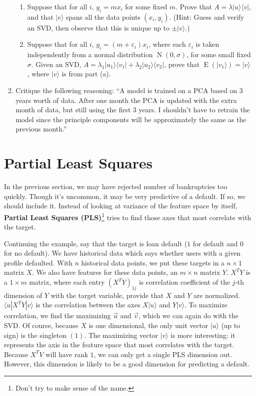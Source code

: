 \documentclass{amsbook}
\begin{document}
\begin{enumerate}
\begin{enumerate}
\item Suppose that for all $i$, $y_i=mx_i$ for some fixed $m$.  Prove that $A=\lambda|u\rangle\langle v|$, and that $|v\rangle$ spans all the data points $(x_i, y_i)$.  (Hint: Guess and verify an SVD, then observe that this is unique up to $\pm |v\rangle$.)
\item Suppose that for all $i$, $y_i=(m+\varepsilon_i)x_i$, where each $\varepsilon_i$ is taken independently from a normal distribution $\operatorname{N}(0, \sigma)$, for some small fixed $\sigma$.  Given an SVD, $A=\lambda_1|u_1\rangle\langle v_1|+\lambda_2|u_2\rangle\langle v_2|$, prove that $\operatorname{E}\left(|v_1\rangle\right)=|v\rangle$, where $|v\rangle$ is from part (a).
\end{enumerate}
\item Critique the following reasoning:  “A model is trained on a PCA based on 3 years worth of data.  After one month the PCA is updated with the extra month of data, but still using the first 3 years.  I shouldn’t have to retrain the model since the principle components will be approximately the same as the previous month.”
\end{enumerate}

\section{Partial Least Squares}

In the previous section, we may have rejected number of bankruptcies too quickly.  Though it's uncommon, it may be very predictive of a default.  If so, we should include it.  Instead of looking at variance of the feature space by itself, {\bf Partial Least Squares (PLS)}\footnote{Don't try to make sense of the name.} tries to find those axes that most correlate with the target.

Continuing the example, say that the target is loan default ($1$ for default and $0$ for no default).  We have historical data which says whether users with a given profile defaulted.  With $n$ historical data points, we put these targets in a $n\times 1$ matrix $X$.  We also have features for these data points, an $m\times n$ matrix $Y$.  $X^TY$ is a $1\times m$ matrix, where each entry $(X^TY)_{1j}$ is correlation coefficient of the $j$-th dimension of $Y$ with the target variable, provide that $X$ and $Y$ are normalized.  $\langle u|X^TY|v\rangle$ is the correlation between the axes $X|u\rangle$ and $Y|v\rangle$.  To maximize correlation, we find the maximizing $\vec u$ and $\vec v$, which we can again do with the SVD.  Of course, because $X$ is one dimensional, the only unit vector $|u\rangle$ (up to sign) is the singleton $(1)$.  The maximizing vector $|v\rangle$ is more interesting; it represents the axis in the feature space that most correlates with the target.  Because $X^TV$ will have rank $1$, we can only get a single PLS dimension out.  However, this dimension is likely to be a good dimension for predicting a default.
\end{document}
